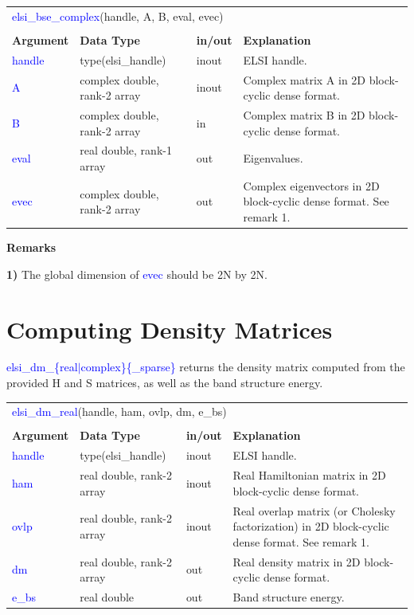 \documentclass{report}
\newcommand{\tcb}[1]{\textcolor{blue}{#1}}
\begin{document}
\begin{tabular}[]{|p{20mm}|p{45mm}|p{15mm}|p{85mm}|}
\multicolumn{4}{l}{\tcb{elsi\_bse\_complex}(handle, A, B, eval, evec)}\\
\multicolumn{4}{l}{}\\
\hline
\multicolumn{1}{|l|}{\textbf{Argument}} & \multicolumn{1}{l|}{\textbf{Data Type}} & \multicolumn{1}{l|}{\textbf{in/out}} & \multicolumn{1}{l|}{\textbf{Explanation}}\\
\hline
\tcb{handle} & type(elsi\_handle)           & inout & ELSI handle.\\
\hline
\tcb{A}      & complex double, rank-2 array & inout & Complex matrix A in 2D block-cyclic dense format.\\
\hline
\tcb{B}      & complex double, rank-2 array & in    & Complex matrix B in 2D block-cyclic dense format.\\
\hline
\tcb{eval}   & real double, rank-1 array    & out   & Eigenvalues.\\
\hline
\tcb{evec}   & complex double, rank-2 array & out   & Complex eigenvectors in 2D block-cyclic dense format. See remark 1.\\
\hline
\end{tabular}

\textbf{Remarks}

\textbf{1)} The global dimension of \tcb{evec} should be 2N by 2N.

\section{Computing Density Matrices}
\label{sec:dm}
\tcb{elsi\_dm\_\{real$\vert$complex\}\{\_sparse\}} returns the density matrix computed from the provided H and S matrices, as well as the band structure energy.

\begin{tabular}[]{|p{20mm}|p{45mm}|p{15mm}|p{85mm}|}
\multicolumn{4}{l}{\tcb{elsi\_dm\_real}(handle, ham, ovlp, dm, e\_bs)}\\
\multicolumn{4}{l}{}\\
\hline
\multicolumn{1}{|l|}{\textbf{Argument}} & \multicolumn{1}{l|}{\textbf{Data Type}} & \multicolumn{1}{l|}{\textbf{in/out}} & \multicolumn{1}{l|}{\textbf{Explanation}}\\
\hline
\tcb{handle} & type(elsi\_handle)        & inout & ELSI handle.\\
\hline
\tcb{ham}    & real double, rank-2 array & inout & Real Hamiltonian matrix in 2D block-cyclic dense format.\\
\hline
\tcb{ovlp}   & real double, rank-2 array & inout & Real overlap matrix (or Cholesky factorization) in 2D block-cyclic dense format. See remark 1.\\
\hline
\tcb{dm}     & real double, rank-2 array & out   & Real density matrix in 2D block-cyclic dense format.\\
\hline
\tcb{e\_bs}  & real double               & out   & Band structure energy.\\
\hline
\end{tabular}
\end{document}
